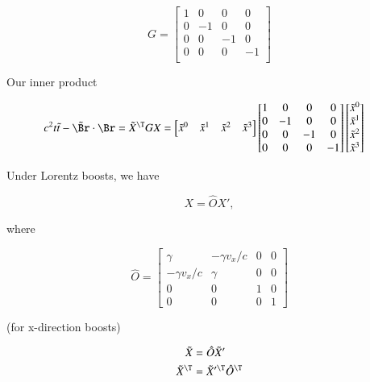 \begin{equation}\label{eqn:relativisticElectrodynamicsL6:60}
G = 
\begin{bmatrix}
1 & 0 & 0 & 0 \\
0 & -1 & 0 & 0 \\
0 & 0 & -1 & 0 \\
0 & 0 & 0 & -1 \\
\end{bmatrix}
\end{equation}

Our inner product 

\begin{align*}
c^2 t \tilde{t} - \tilde{\Br} \cdot \Br = \tilde{X}^\T G X 
&=
\begin{bmatrix}
\tilde{x}^0 & \tilde{x}^1 & \tilde{x}^2 & \tilde{x}^3 
\end{bmatrix}
\begin{bmatrix}
1 & 0 & 0 & 0 \\
0 & -1 & 0 & 0 \\
0 & 0 & -1 & 0 \\
0 & 0 & 0 & -1 \\
\end{bmatrix}
\begin{bmatrix}
\tilde{x}^0 \\
\tilde{x}^1 \\
\tilde{x}^2 \\
\tilde{x}^3 \\
\end{bmatrix}
\end{align*}

Under Lorentz boosts, we have

\begin{equation}\label{eqn:relativisticElectrodynamicsL6:70}
X = \hat{O} X',
\end{equation}

where 

\begin{equation}\label{eqn:relativisticElectrodynamicsL6:80}
\hat{O} =
\begin{bmatrix}
\gamma & - \gamma v_x/c  & 0 & 0 \\
- \gamma v_x/c & \gamma  & 0 & 0 \\
0 & 0 & 1 & 0 \\
0 & 0 & 0 & 1 
\end{bmatrix}
\end{equation}

(for x-direction boosts)

\begin{align}\label{eqn:relativisticElectrodynamicsL6:90}
\tilde{X} &= \hat{O} \tilde{X}' \\
\tilde{X}^\T &= \tilde{X}'^\T \hat{O}^\T
\end{align}


